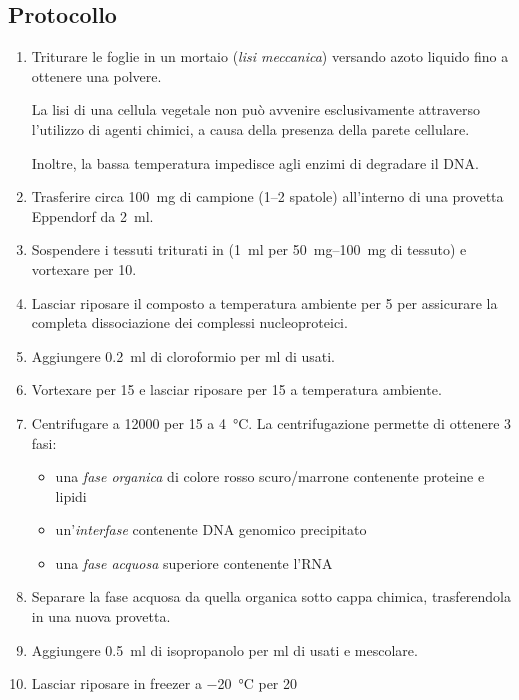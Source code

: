 \subsection{Protocollo}
\begin{enumerate}
	\item Triturare le foglie in un mortaio (\textit{lisi meccanica}) versando azoto liquido fino a ottenere una polvere.
	      \begin{Note}
		      La lisi di una cellula vegetale non può avvenire esclusivamente attraverso l’utilizzo di agenti chimici, a causa della presenza della parete cellulare.

		      Inoltre, la bassa temperatura impedisce agli enzimi di degradare il DNA.
	      \end{Note}
	\item Trasferire circa \qty{100}{\mg} di campione (\numrange{1}{2} spatole) all’interno di una provetta \foreignlanguage{german}{Eppendorf} da \qty{2}{\ml}.
	\item Sospendere i tessuti triturati in \trizol (\qty{1}{ml} per \qtyrange{50}{100}{\mg} di tessuto) e vortexare per \qty{10}{\sec}.
	\item Lasciar riposare il composto a temperatura ambiente per \qty{5}{\min} per assicurare la completa dissociazione dei complessi nucleoproteici.
	\item Aggiungere \qty{0.2}{\ml} di cloroformio per ml di \trizol usati.
	\item Vortexare per \qty{15}{\sec} e lasciar riposare per \qty{15}{\min} a temperatura ambiente.
	\item Centrifugare a \qty{12000}{\giri} per \qty{15}{\min} a \qty{4}{\celsius}. La centrifugazione permette di ottenere 3 fasi:
	      \begin{itemize}
		      \item una \emph{fase organica} di colore rosso scuro/marrone contenente proteine e lipidi
		      \item un’\emph{interfase} contenente DNA genomico precipitato
		      \item una \emph{fase acquosa} superiore contenente l’RNA
	      \end{itemize}
	\item Separare la fase acquosa da quella organica sotto cappa chimica, trasferendola in una nuova provetta.
	\item Aggiungere \qty{0.5}{ml} di isopropanolo per \unit{\ml} di \trizol usati e mescolare.
	\item Lasciar riposare in freezer a \qty{-20}{\celsius} per \qty{20}{\min}

\end{enumerate}
